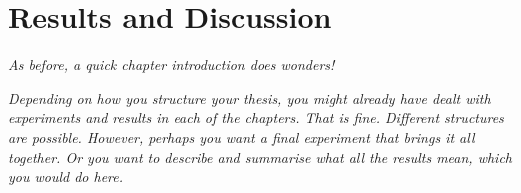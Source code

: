 %
%
\chapter{Results and Discussion}
\label{ch::ResultsAndDiscussion}
\emph{As before, a quick chapter introduction does wonders!}

\emph{Depending on how you structure your thesis, you might already have dealt with experiments and results in each of the chapters. That is fine. Different structures are possible. However, perhaps you want a final experiment that brings it all together. Or you want to describe and summarise what all the results mean, which you would do here.}
